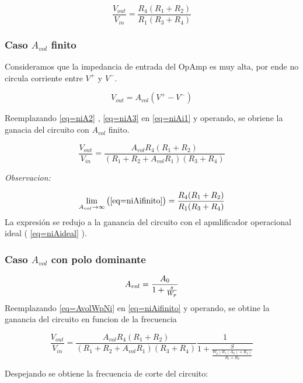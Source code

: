 \documentclass[../../main.tex]{subfiles}
\begin{document}
\begin{equation}
\frac{V_{out}}{V_{in}}= \frac {R_{4}(R_{1}+R_{2})}{R_{1}(R_{3}+R_{4})} \label{eq=niAideal}
\end{equation}




\subsubsection{Caso $A_{vol}$ finito}
Consideramos que la impedancia de entrada del OpAmp es muy alta, por ende no circula corriente entre $V^{+}$ y $V^{-}$.

\begin{equation}
V_{out}=A_{vol}(V^{+}-V^{-})\label{eq=niAi1} 
\end{equation}

Reemplazando \ref{eq=niA2} , \ref{eq=niA3} en \ref{eq=niAi1} y operando, se obriene la ganacia del circuito con $A_{vol}$ finito.

\begin{equation}
 \frac{V_{out}}{V_{in}}=\frac{A_{vol}R_{4}(R_{1}+R_{2})}{(R_{1}+R_{2}+A_{vol}	R_{1})(R_{3}+R_{4})}\label{eq=niAifinito} 
\end{equation}

\textit{Observacion:}

$$ \lim_{A_{vol}\to\infty} \big( \ref{eq=niAifinito} \big) = \frac {R_{4}(R_{1}+R_{2})}{R_{1}(R_{3}+R_{4})} $$
La expresión se redujo a la ganancia del circuito con el apmlificador operacional ideal \big( \ref{eq=niAideal} \big).


\subsubsection{Caso $A_{vol}$  con polo dominante}
\begin{equation}
A_{vol }=\frac{A_{0}}{1+\frac{s}{W_{p}}}\label{eq=AvolWpNi}\\
\end{equation} 
Reemplazando \ref{eq=AvolWpNi} en \ref{eq=niAifinito}  y operando, se obtine la ganancia del circuito en funcion de la frecuencia

\begin{equation}
 \frac{V_{out}}{V_{in}}=\frac{A_{vol}R_{4}(R_{1}+R_{2})}{(R_{1}+R_{2}+A_{vol}	R_{1})(R_{3}+R_{4})}  \frac{1}{1 + \frac{S}{\frac{W_{p}(R_{1}(A_{0})+R_{2})}{R_{1}+R_{2}}}}\label{eq=AvolPoloNi}
\end{equation}

Despejando se obtiene la frecuencia de corte del circuito:
\end{document}
